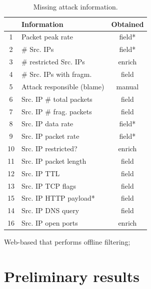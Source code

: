 \documentclass{llncs}
\begin{document}
\begin{table}[h!] \small \center \caption{Missing attack information.}
\label{tab:missing_info} \begin{tabular}{| c | l |c|} \hline
&\textbf{Information}     & \textbf{Obtained}\\ 
\hline 
1& Packet peak rate & field*\\ \hline
2&\# Src. IPs &field*\\\hline	
3&\# restricted Src. IPs & enrich \\\hline 
4&\# Src. IPs with fragm. & field \\\hline
5&Attack responsible (blame)& manual\\\hline
\hline\hline
6&Src. IP \# total packets&field\\ \hline
7&Src. IP \# frag. packets  &field\\ \hline 
8&Src. IP data rate & field*\\ \hline
9&Src. IP packet rate & field* \\ \hline
10&Src. IP restricted?  &enrich \\ \hline 
11&Src. IP packet length &field \\ \hline 
12&Src. IP TTL  &field \\ \hline
\rowcolor{yellow}13&Src. IP TCP flags &field \\ \hline 
\rowcolor{yellow}15&Src. IP HTTP payload* & field\\ \hline
\rowcolor{yellow}14&Src. IP DNS query  & field\\ \hline 
\rowcolor{yellow}16&Src. IP open ports &enrich\\ \hline 

\end{tabular}
\end{table}


Web-based that performs offline filtering;




\section{Preliminary results}
\end{document}
